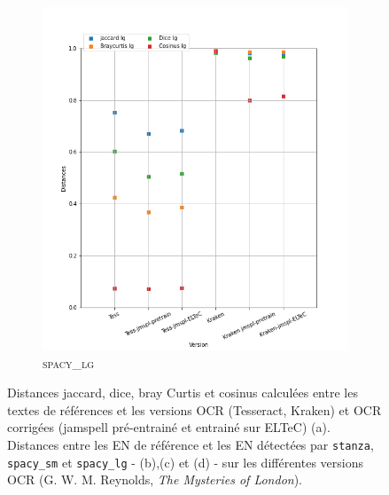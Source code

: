 \begin{figure}[H]
\begin{minipage}{6cm}
\begin{subfigure}{0.89\textwidth}
  \includegraphics[width=.89\textwidth]{IMAGES/ELTeC_DISTANCES_spaCy3.5.1/REYNOLDS-The-Mysteries-of-London-graph-dist-spaCy3.5.1-lg.png}
   \caption{\textsc{spacy\_lg}}
  \label{fig: }
  \end{subfigure}
  \end{minipage}
\caption{Distances jaccard, dice, bray Curtis et cosinus calculées entre les textes de références et les versions OCR (Tesseract, Kraken) et OCR corrigées (jamspell pré-entrainé et entrainé sur ELTeC) (a). Distances entre les EN de référence et les EN détectées par \texttt{stanza}, \texttt{spacy\_sm} et \texttt{spacy\_lg} - (b),(c) et (d) - sur les différentes versions OCR (G. W. M. Reynolds, \textit{The Mysteries of London}).}
\label{fig:}
\end{figure}


